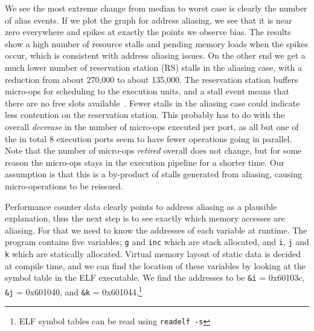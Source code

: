 \documentclass[prodmode,acmtaco]{acmsmall}
\begin{document}
We see the most extreme change from median to worst case is clearly the number of alias events.
If we plot the graph for address aliasing, we see that it is near zero everywhere and spikes at exactly the points we observe bias. 
The results show a high number of resource stalls and pending memory loads when the spikes occur, which is consistent with address aliasing issues.
On the other end we get a much lower number of reservation station (RS) stalls in the aliasing case, with a reduction from about 270,000 to about 135,000.
The reservation station buffers micro-ops for scheduling to the execution units, and a stall event means that there are no free slots available~\cite[Table 19-2]{Volume3B}.
Fewer stalls in the aliasing case could indicate less contention on the reservation station.
This probably has to do with the overall \emph{decrease} in the number of micro-ops executed per port, as all but one of the in total 8 execution ports seem to have fewer operations going in parallel.
Note that the number of micro-ops \emph{retired} overall does not change, but for some reason the micro-ops stays in the execution pipeline for a shorter time.
Our assumption is that this is a by-product of stalls generated from aliasing, causing micro-operations to be reissued.

Performance counter data clearly points to address aliasing as a plausible explanation, thus the next step is to see exactly which memory accesses are aliasing. 
For that we need to know the addresses of each variable at runtime.
The program contains five variables; \texttt{g} and \texttt{inc} which are stack allocated, and \texttt{i}, \texttt{j} and \texttt{k} which are statically allocated.
Virtual memory layout of static data is decided at compile time, and we can find the location of these variables by looking at the symbol table in the ELF executable.
We find the addresses to be \texttt{\&i} = 0x60103c, \texttt{\&j} = 0x601040, and \texttt{\&k} = 0x601044.\footnote{ELF symbol tables can be read using \texttt{readelf -s}}
\end{document}

